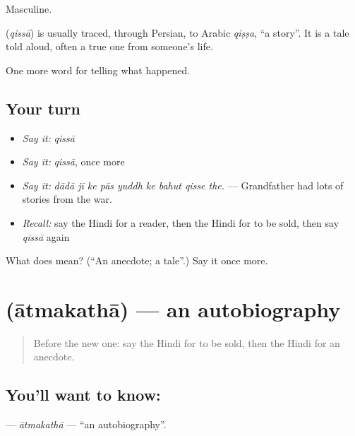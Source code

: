 Masculine.

\begin{cousinweb}
\textbf{} (\emph{qissā}) is usually traced, through Persian, to Arabic \emph{qiṣṣa}, \textquotedblleft{}a story\textquotedblright{}. It is a tale told aloud, often a true one from someone's life.
\end{cousinweb}

\begin{grammarlens}[title={What you've built}]
One more word for telling what happened.
\end{grammarlens}

\subsection*{Your turn}
\begin{itemize}
\raggedright
  \item \emph{Say it:} \emph{qissā}
  \item \emph{Say it:} \emph{qissā}, once more
  \item \emph{Say it:} \emph{dādā jī ke pās yuddh ke bahut qisse the.} — Grandfather had lots of stories from the war.
  \item \emph{Recall:} say the Hindi for a reader, then the Hindi for to be sold, then say \emph{qissā} again
\end{itemize}

\begin{tcolorbox}[breakable,colback=teal!4,colframe=teal!35!black,title={Before you move on}]
What does  mean? (\textquotedblleft{}An anecdote; a tale\textquotedblright{}.) Say it once more.
\end{tcolorbox}
\section[\texorpdfstring{\hi{आत्मकथा} (ātmakathā)}{आत्मकथा (ātmakathā)}]{ (ātmakathā) — an autobiography}

\label{lesson:HI-C342-atmakatha}



\begin{quote}
Before the new one: say the Hindi for to be sold, then the Hindi for an anecdote.
\end{quote}

\subsection*{You'll want to know: }
\textbf{} — \emph{ātmakathā} — \textquotedblleft{}an autobiography\textquotedblright{}.

